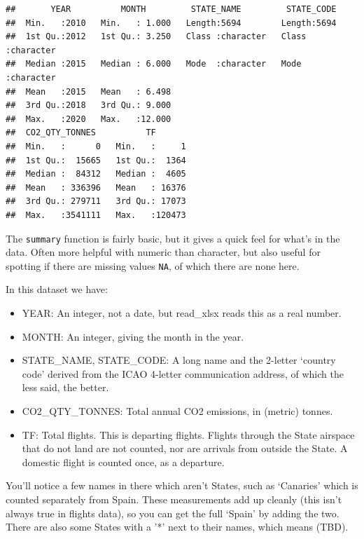 \documentclass[
]{book}
\providecommand{\tightlist}{%
  \setlength{\itemsep}{0pt}\setlength{\parskip}{0pt}}
\begin{document}
\begin{verbatim}
##       YEAR          MONTH         STATE_NAME         STATE_CODE       
##  Min.   :2010   Min.   : 1.000   Length:5694        Length:5694       
##  1st Qu.:2012   1st Qu.: 3.250   Class :character   Class :character  
##  Median :2015   Median : 6.000   Mode  :character   Mode  :character  
##  Mean   :2015   Mean   : 6.498                                        
##  3rd Qu.:2018   3rd Qu.: 9.000                                        
##  Max.   :2020   Max.   :12.000                                        
##  CO2_QTY_TONNES          TF        
##  Min.   :      0   Min.   :     1  
##  1st Qu.:  15665   1st Qu.:  1364  
##  Median :  84312   Median :  4605  
##  Mean   : 336396   Mean   : 16376  
##  3rd Qu.: 279711   3rd Qu.: 17073  
##  Max.   :3541111   Max.   :120473
\end{verbatim}

The \texttt{summary} function is fairly basic, but it gives a quick feel for what's in the data. Often more helpful with numeric than character, but also useful for spotting if there are missing values \texttt{NA}, of which there are none here.

In this dataset we have:

\begin{itemize}
\tightlist
\item
  YEAR: An integer, not a date, but read\_xlsx reads this as a real number.
\item
  MONTH: An integer, giving the month in the year.
\item
  STATE\_NAME, STATE\_CODE: A long name and the 2-letter `country code' derived from the ICAO 4-letter communication address, of which the less said, the better.
\item
  CO2\_QTY\_TONNES: Total annual CO2 emissions, in (metric) tonnes.
\item
  TF: Total flights. This is departing flights. Flights through the State airspace that do not land are not counted, nor are arrivals from outside the State. A domestic flight is counted once, as a departure.
\end{itemize}

You'll notice a few names in there which aren't States, such as `Canaries' which is counted separately from Spain. These measurements add up cleanly (this isn't always true in flights data), so you can get the full `Spain' by adding the two. There are also some States with a '*' next to their names, which means (TBD).
\end{document}
